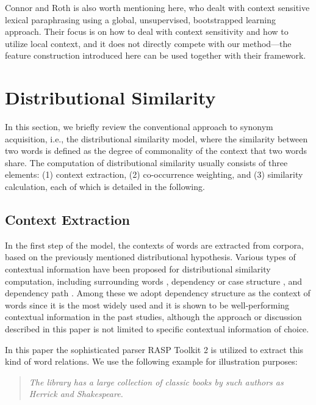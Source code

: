 \documentclass[english]{jnlp_1.4}
\begin{document}
Connor and Roth \cite{Connor:07} is also worth mentioning here, who
dealt with context sensitive lexical paraphrasing using a global,
unsupervised, bootstrapped learning approach. Their focus is on how to
deal with context sensitivity and how to utilize local context, and it
does not directly compete with our method---the feature construction
introduced here can be used together with their framework.



\section{Distributional Similarity}

In this section, we briefly review the conventional approach to
synonym acquisition, i.e., the distributional similarity model, where
the similarity between two words is defined as the degree of
commonality of the context that two words share. The computation of
distributional similarity usually consists of three elements: (1)
context extraction, (2) co-occurrence weighting, and (3) similarity
calculation, each of which is detailed in the following.


\subsection{Context Extraction}

In the first step of the model, the contexts of words are extracted
from corpora, based on the previously mentioned distributional
hypothesis. Various types of contextual information have been proposed
for distributional similarity computation, including surrounding words
\cite{Curran:02:scaling,Lowe:00}, dependency or case structure
\cite{Hindle:90,Ruge:97,Lin:98:automatic}, and dependency path
\cite{Lin:01,Pado:07}. Among these we adopt dependency structure as
the context of words since it is the most widely used and it is shown
to be well-performing contextual information in the past studies,
although the approach or discussion described in this paper is not
limited to specific contextual information of choice.

In this paper the sophisticated parser RASP Toolkit 2
\cite{Briscoe:06} is utilized to extract this kind of word
relations. We use the following example for illustration purposes:
\begin{quote}
 \textit{The library has a large collection of classic books by such
 authors as Herrick and Shakespeare.}
\end{quote}
\end{document}
